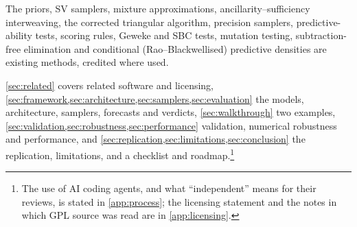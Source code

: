 The priors, SV samplers, mixture approximations, ancillarity--sufficiency interweaving, the corrected triangular algorithm, precision samplers, predictive-ability tests, scoring rules, Geweke and SBC tests, mutation testing, subtraction-free elimination and conditional (Rao--Blackwellised) predictive densities are existing methods, credited where used. %

\cref{sec:related} covers related software and licensing, \cref{sec:framework,sec:architecture,sec:samplers,sec:evaluation} the models, architecture, samplers, forecasts and verdicts, \cref{sec:walkthrough} two examples, \cref{sec:validation,sec:robustness,sec:performance} validation, numerical robustness and performance, and \cref{sec:replication,sec:limitations,sec:conclusion} the replication, limitations, and a checklist and roadmap.\footnote{The use of AI coding agents, and what ``independent'' means for their reviews, is stated in \cref{app:process}; the licensing statement and the notes in which GPL source was read are in \cref{app:licensing}.}
